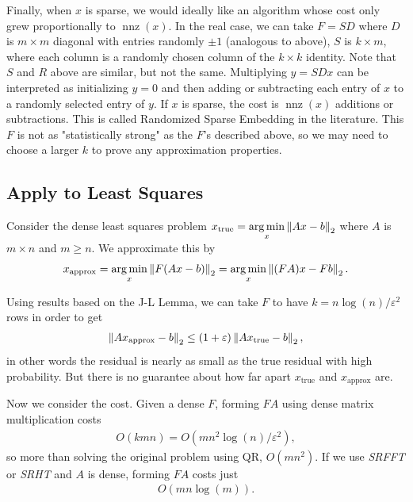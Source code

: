 \documentclass[11pt]{article}
\numberwithin{equation}{section}
\begin{document}
Finally, when $x$ is sparse, we would ideally like an algorithm whose cost only grew proportionally to $\operatorname{nnz}(x)$. In the real case, 
we can take $F = SD$ where $D$ is $m \times m$ diagonal with entries randomly $\pm 1$ (analogous to above), $S$ is $k \times m$, 
where each column is a randomly chosen column of the $k \times k$ identity. Note that $S$ and $R$ above are similar, but not the same. 
Multiplying $y = SDx$ can be interpreted as initializing $y=0$ and then adding or subtracting each entry of $x$ to a randomly selected entry of $y$. 
If $x$ is sparse, the cost is $\operatorname{nnz}(x)$ additions or subtractions. This is called Randomized Sparse Embedding in the literature.
This $F$ is not as "statistically strong" as the $F$'s described above, so we may need to choose a larger $k$ to prove any approximation properties.

\subsection{Apply to Least Squares}
Consider the dense least squares problem $x_{\mathrm{true}} = \underset{x}{\arg\min}\left\| Ax-b \right\|_2$ where $A$ is $m \times n$ and $m \geq n$. 
We approximate this by \begin{align*}
    x_{\mathrm{approx}} = \underset{x}{\arg\min} \left\| F(Ax-b) \right\|_2 = \underset{x}{\arg\min}\left\| (FA)x - Fb \right\|_2.
\end{align*}

Using results based on the J-L Lemma, we can take $F$ to have $k = n\log(n)/\varepsilon^2$ rows in order to get \begin{align*}
    \left\| Ax_{\mathrm{approx}} - b \right\|_2 \leq (1+\varepsilon)\left\| Ax_{\mathrm{true}} - b \right\|_2,
\end{align*} 
in other words the residual is nearly as small as the true residual with high probability. 
But there is no guarantee about how far apart $x_{\mathrm{true}}$ and $x_{\mathrm{approx}}$ are.

Now we consider the cost. Given a dense $F$, forming $FA$ using dense matrix multiplication costs \begin{align*}
    O(kmn) = O(mn^2\log(n)/\varepsilon^2),
\end{align*}
so more than solving the original problem using QR, $O(mn^2)$. If we use \textit{SRFFT} or \textit{SRHT} and $A$ is dense, forming $FA$ costs just \begin{align*}
    O(mn\log(m)).
\end{align*}
\end{document}
